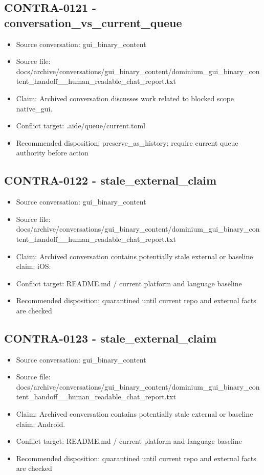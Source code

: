 \documentclass[11pt,a4paper]{report}
\begin{document}
\subsection{CONTRA-0121 - conversation\_vs\_current\_queue}

\begin{itemize}
\item Source conversation: gui\_binary\_content
\item Source file: docs/archive/conversations/gui\_binary\_content/dominium\_gui\_binary\_content\_handoff\_\_human\_readable\_chat\_report.txt
\item Claim: Archived conversation discusses work related to blocked scope native\_gui.
\item Conflict target: .aide/queue/current.toml
\item Recommended disposition: preserve\_as\_history; require current queue authority before action
\end{itemize}

\subsection{CONTRA-0122 - stale\_external\_claim}

\begin{itemize}
\item Source conversation: gui\_binary\_content
\item Source file: docs/archive/conversations/gui\_binary\_content/dominium\_gui\_binary\_content\_handoff\_\_human\_readable\_chat\_report.txt
\item Claim: Archived conversation contains potentially stale external or baseline claim: iOS.
\item Conflict target: README.md / current platform and language baseline
\item Recommended disposition: quarantined until current repo and external facts are checked
\end{itemize}

\subsection{CONTRA-0123 - stale\_external\_claim}

\begin{itemize}
\item Source conversation: gui\_binary\_content
\item Source file: docs/archive/conversations/gui\_binary\_content/dominium\_gui\_binary\_content\_handoff\_\_human\_readable\_chat\_report.txt
\item Claim: Archived conversation contains potentially stale external or baseline claim: Android.
\item Conflict target: README.md / current platform and language baseline
\item Recommended disposition: quarantined until current repo and external facts are checked
\end{itemize}
\end{document}
